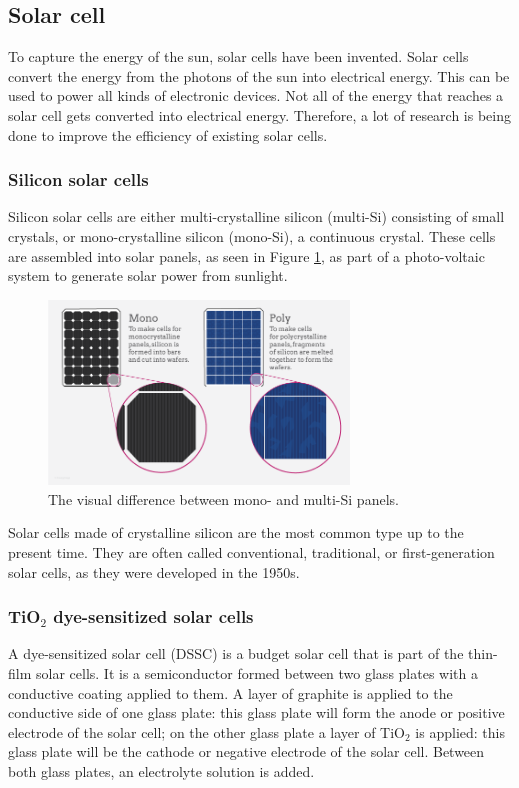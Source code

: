 \documentclass[conference]{IEEEtran}
\begin{document}
\subsection{Solar cell}
To capture the energy of the sun, solar cells have been invented. Solar cells convert the energy from the photons of the sun into electrical energy. This can be used to power all kinds of electronic devices. Not all of the energy that reaches a solar cell gets converted into electrical energy. Therefore, a lot of research is being done to improve the efficiency of existing solar cells.\\

\subsubsection{Silicon solar cells}
Silicon solar cells are either multi-crystalline silicon (multi-Si) consisting of small crystals, or mono-crystalline silicon (mono-Si), a continuous crystal. These cells are assembled into solar panels, as seen in Figure \ref{fig:monomulti}, as part of a photo-voltaic system to generate solar power from sunlight.\\

\begin{figure}[h]
\centering
\includegraphics[width=80mm]{monomulti.png}
\caption{The visual difference between mono- and multi-Si panels. \cite{monomulti}}
\label{fig:monomulti} %
\end{figure}

Solar cells made of crystalline silicon are the most common type up to the present time. They are often called conventional, traditional, or first-generation solar cells, as they were developed in the 1950s.\\

\subsubsection{TiO$_2$ dye-sensitized solar cells}
A dye-sensitized solar cell (DSSC) is a budget solar cell that is part of the thin-film solar cells. It is a semiconductor formed between two glass plates with a conductive coating applied to them. A layer of graphite is applied to the conductive side of one glass plate: this glass plate will form the anode or positive electrode of the solar cell; on the other glass plate a layer of TiO$_2$ is applied: this glass plate will be the cathode or negative electrode of the solar cell. Between both glass plates, an electrolyte solution is added.\\
\end{document}
